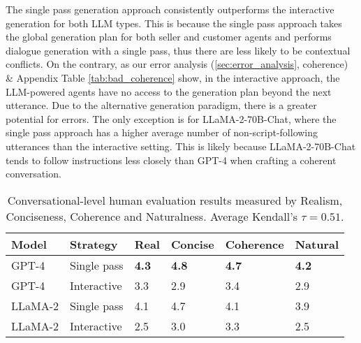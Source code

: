 The single pass generation approach consistently outperforms the interactive generation for both LLM types. This is because the single pass approach takes the global generation plan for both seller and customer agents and performs dialogue generation with a single pass, thus there are less likely to be contextual conflicts. %
On the contrary, as our error analysis (\ref{sec:error_analysis}, coherence) \& Appendix Table \ref{tab:bad_coherence} show, in the interactive approach, the LLM-powered agents have no access to the generation plan beyond the next utterance. Due to the alternative generation paradigm, there is a greater potential for errors. The only exception is for LLaMA-2-70B-Chat, where the single pass approach has a higher average number of non-script-following utterances than the interactive setting. This is likely because LLaMA-2-70B-Chat tends to follow instructions less closely than GPT-4 when crafting a coherent conversation. %

\begin{table}[t] \small
\centering
\setlength{\tabcolsep}{2pt} %
\begin{tabular}{llllll}
\hline
\textbf{Model} & \textbf{Strategy} & \textbf{Real} & \textbf{Concise} & \textbf{Coherence} & \textbf{Natural}\\ \hline
GPT-4   & Single pass & \textbf{4.3} & \textbf{4.8} & \textbf{4.7} & \textbf{4.2}\\ \hline
GPT-4   & Interactive & 3.3 & 2.9 & 3.4 & 2.9 \\ \hline
LLaMA-2 & Single pass & 4.1 & 4.7 & 4.1 & 3.9\\ \hline
LLaMA-2 & Interactive & 2.5 & 3.0 & 3.3 & 2.5 \\ \hline

\end{tabular}
\vspace{-1em}
\caption{Conversational-level human evaluation results measured by Realism, Conciseness, Coherence and Naturalness. Average Kendall's $\tau = 0.51$.}
\label{tab:conversation_level_human_evaluation}
\vspace{-0.5em}
\end{table}

